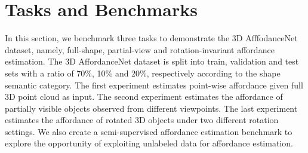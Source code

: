 \documentclass[final]{cvpr}
\begin{document}
\section{Tasks and Benchmarks}
In this section, we benchmark three tasks to demonstrate the 3D AfffodanceNet dataset, namely, full-shape, partial-view and rotation-invariant affordance estimation. The 3D AffordanceNet dataset is split into train, validation and test sets with a ratio of 70\%, 10\% and 20\%, respectively according to the shape semantic category. 
The first experiment estimates point-wise affordance given full 3D point cloud as input. The second experiment estimates the affordance of partially visible objects observed from different viewpoints. The last experiment estimates the affordance of rotated 3D objects under two different rotation settings. We also create a semi-supervised affordance estimation benchmark to explore the opportunity of exploiting unlabeled data for affordance estimation.
\vspace{-0.1cm}


\begin{table}[t]
\caption{The number of shapes that are positive for each category of affordance.}
\vspace{-0.6cm}
\label{affordance_stats}
\end{table}
\end{document}
